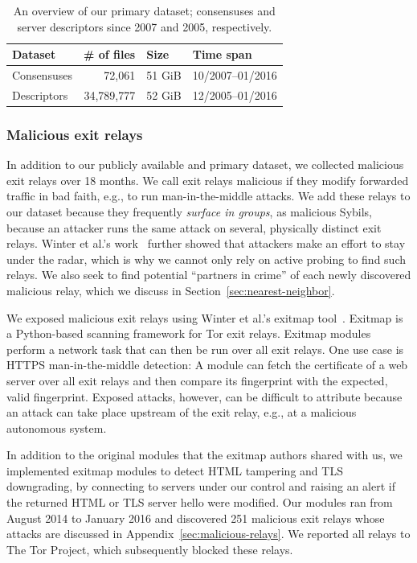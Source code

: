 \begin{table}[t]
\small
\centering
\begin{tabular}{l r l l}
\toprule
\textbf{Dataset} & \textbf{\# of files} & \textbf{Size} & \textbf{Time span} \\
\midrule
Consensuses & 72,061 & 51 GiB & 10/2007--01/2016 \\
Descriptors & 34,789,777 & 52 GiB & 12/2005--01/2016 \\
\bottomrule
\end{tabular}
\caption{An overview of our primary dataset; consensuses and server descriptors
since 2007 and 2005, respectively.}
\label{tab:collector-dataset}
\end{table}

\subsubsection{Malicious exit relays}
In addition to our publicly available and primary dataset, we collected
malicious exit relays over 18 months.  We call exit relays malicious if they
modify forwarded traffic in bad faith, e.g., to run man-in-the-middle attacks.
We add these relays to our dataset because they frequently \emph{surface in
groups}, as malicious Sybils, because an attacker runs the same attack on
several, physically distinct exit relays.  Winter et al.'s work~\cite[\S
5.2]{Winter2014a} further showed that attackers make an effort to stay under the
radar, which is why we cannot only rely on active probing to find such relays.
We also seek to find potential ``partners in crime'' of each newly discovered
malicious relay, which we discuss in Section~\ref{sec:nearest-neighbor}.

We exposed malicious exit relays using Winter et al.'s exitmap
tool~\cite{Winter2014a}.  Exitmap is a Python-based scanning framework for Tor
exit relays.  Exitmap modules perform a network task that can then be run over
all exit relays.  One use case is HTTPS man-in-the-middle detection: A module
can fetch the certificate of a web server over all exit relays and then compare
its fingerprint with the expected, valid fingerprint.  Exposed attacks, however,
can be difficult to attribute because an attack can take place upstream of the
exit relay, e.g., at a malicious autonomous system.

In addition to the original modules that the exitmap authors shared with us, we
implemented exitmap modules to detect HTML tampering and TLS downgrading, by
connecting to servers under our control and raising an alert if the returned
HTML or TLS server hello were modified.  Our modules ran from August 2014 to
January 2016 and discovered 251 malicious exit relays whose attacks are
discussed in Appendix~\ref{sec:malicious-relays}.  We reported all relays to The
Tor Project, which subsequently blocked these relays.

